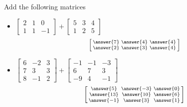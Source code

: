 \documentclass{ximera}
\begin{document}
\begin{exercise}%
    Add the following matrices
    \begin{itemize}
        \item
        $\begin{bmatrix}
            2 & 1 & 0 \\
            1 & 1 & -1
        \end{bmatrix}
        +
        \begin{bmatrix}
            5 & 3 & 4 \\
            1 & 2 & 5
        \end{bmatrix}$
        \[
            \left[\begin{smallmatrix} \answer{7} & \answer{4} & \answer{4} \\ \answer{2} & \answer{3} & \answer{4} \end{smallmatrix}\right]
        \]
        \item
        $\begin{bmatrix}
            6 & -2 & 3 \\
            7 & 3 & 3 \\
            8 & -1 & 2
        \end{bmatrix}
        +
        \begin{bmatrix}
            -1 & -1 & -3 \\
            6 & 7 & 3 \\
            -9 & 4 & -1
        \end{bmatrix}$
        \[
            \left[\begin{smallmatrix} \answer{5} & \answer{-3} & \answer{0} \\ \answer{13} & \answer{10} & \answer{6} \\ \answer{-1} & \answer{3} & \answer{1} \end{smallmatrix}\right]
        \]
    \end{itemize}
\end{exercise}
\end{document}
